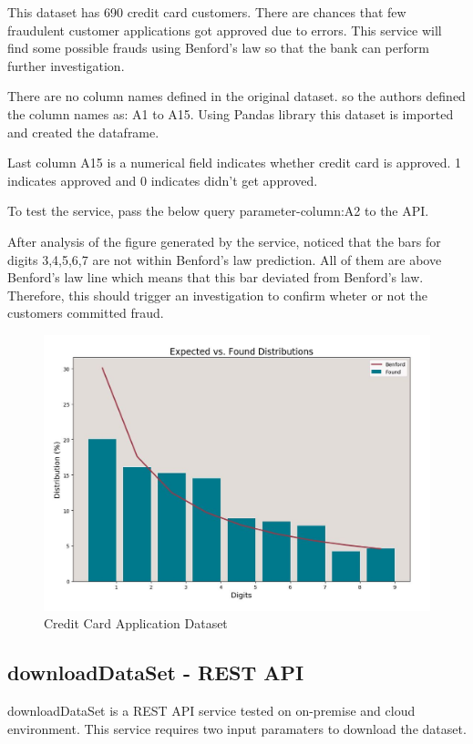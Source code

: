 This dataset has 690 credit card customers.
There are chances that few fraudulent customer 
applications got approved due to errors. 
This service will find some possible frauds using 
Benford's law so that the bank can perform
further investigation.

There are no column names defined in the original dataset.
so the authors defined the column names as:
A1 to A15. Using Pandas library this dataset
is imported and created the dataframe.

Last column A15 is a numerical field 
indicates whether credit card is approved. 
1 indicates approved and 0 indicates didn't 
get approved.

To test the service, pass the below query
parameter-column:A2 to the API.


After analysis of the figure generated 
by the service, noticed that the bars 
for digits 3,4,5,6,7 are not within 
Benford's law prediction. 
All of them are above Benford's law 
line which means that this bar deviated 
from Benford's law. 
Therefore, this should trigger an investigation 
to confirm wheter or not the customers committed fraud. 

\begin{figure}[!ht]
\centering\includegraphics[width=\columnwidth]{images/fraudDet_cc_data.JPG}
  \caption{Credit Card Application Dataset}\label{f:aust-cc-data}
\end{figure}


\subsection{downloadDataSet - REST API}
downloadDataSet is a REST API service tested on 
on-premise and cloud environment. This service requires two 
input paramaters to download the dataset.

